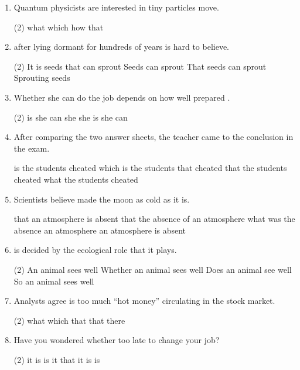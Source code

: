 \begin{enumerate}
\item Quantum physicists are interested in \ttu tiny particles move.
\begin{tasks}(2)
  \task what
  \task which
  \task how
  \task that
\end{tasks}

\item \ttu after lying dormant for hundreds of years is hard to believe.
\begin{tasks}(2)
  \task It is seeds that can sprout
  \task Seeds can sprout
  \task That seeds can sprout
  \task Sprouting seeds
\end{tasks}

\item Whether she can do the job depends on how well prepared \ttu.
\begin{tasks}(2)
  \task is she
  \task can she
  \task she is
  \task she can
\end{tasks}

\item After comparing the two answer sheets, the teacher came to the conclusion \ttu in the exam.
\begin{tasks}
  \task is the students cheated
  \task which is the students that cheated
  \task that the students cheated
  \task what the students cheated
\end{tasks}

\item Scientists believe \ttu made the moon as cold as it is.
\begin{tasks}
  \task that an atmosphere is absent
  \task that the absence of an atmosphere
  \task what was the absence an atmosphere
  \task an atmosphere is absent
\end{tasks}

\item \ttu is decided by the ecological role that it plays.
\begin{tasks}(2)
  \task An animal sees well
  \task Whether an animal sees well
  \task Does an animal see well
  \task So an animal sees well
\end{tasks}

\item Analysts agree \ttu is too much ``hot money'' circulating in the stock market.
\begin{tasks}(2)
  \task what
  \task which
  \task that
  \task that there
\end{tasks}

\item Have you wondered whether \ttu too late to change your job?
\begin{tasks}(2)
  \task it is
  \task is it
  \task that it is
  \task is
\end{tasks}


\end{enumerate}
